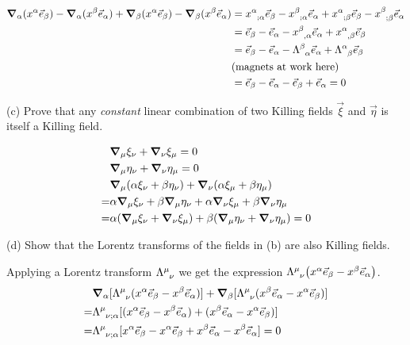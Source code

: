 \documentclass[gr-notes.tex]{subfiles}
\begin{document}
\begin{align*}
  \grad_\alpha (x^\alpha \vec{e}_\beta) -
  \grad_\alpha (x^\beta \vec{e}_\alpha) +
  \grad_\beta (x^\alpha \vec{e}_\beta) -
  \grad_\beta (x^\beta \vec{e}_\alpha)
  &=
  \tensor{x}{^\alpha_{;\alpha}} \vec{e}_\beta -
  \tensor{x}{^\beta_{;\alpha}} \vec{e}_\alpha +
  \tensor{x}{^\alpha_{;\beta}} \vec{e}_\beta -
  \tensor{x}{^\beta_{;\beta}} \vec{e}_\alpha
  \\ &=
  \vec{e}_\beta -
  \vec{e}_\alpha -
  \tensor{x}{^\beta_{,\alpha}} \vec{e}_\alpha +
  \tensor{x}{^\alpha_{,\beta}} \vec{e}_\beta
  \\ &=
  \vec{e}_\beta -
  \vec{e}_\alpha -
  \tensor{\Lambda}{^\beta_\alpha} \vec{e}_\alpha +
  \tensor{\Lambda}{^\alpha_\beta} \vec{e}_\beta
  \\ &
  \text{(magnets at work here)}
  \\ &=
  \vec{e}_\beta -
  \vec{e}_\alpha -
  \vec{e}_\beta +
  \vec{e}_\alpha =
  0
\end{align*}


(c) Prove that any \emph{constant} linear combination of two Killing fields $\vec\xi$ and $\vec\eta$ is itself a Killing field.

\begin{align*}
  &
  \grad_\mu \xi_\nu + \grad_\nu \xi_\mu = 0
  \\
  &
  \grad_\mu \eta_\nu + \grad_\nu \eta_\mu = 0
  \\ &
  \grad_\mu (\alpha \xi_\nu + \beta \eta_\nu) +
  \grad_\nu (\alpha \xi_\mu + \beta \eta_\mu)
  \\ =&
  \alpha \grad_\mu \xi_\nu + \beta \grad_\mu \eta_\nu +
  \alpha \grad_\nu \xi_\mu + \beta \grad_\nu \eta_\mu
  \\ =&
  \alpha (\grad_\mu \xi_\nu + \grad_\nu \xi_\mu) +
  \beta (\grad_\mu \eta_\nu + \grad_\nu \eta_\mu) =
  0
\end{align*}


(d)
Show that the Lorentz transforms of the fields in (b) are also Killing fields.

Applying a Lorentz transform $\tensor{\Lambda}{^\mu_\nu}$ we get the expression $\tensor{\Lambda}{^\mu_\nu} \qty(x^\alpha \vec{e}_\beta - x^\beta \vec{e}_\alpha)$.
%
\begin{align*}
  &
  \grad_\alpha
  [
    \tensor{\Lambda}{^\mu_\nu}
    (x^\alpha \vec{e}_\beta - x^\beta \vec{e}_\alpha)
  ] +
  \grad_\beta
  [
    \tensor{\Lambda}{^\mu_\nu}
    (x^\beta \vec{e}_\alpha - x^\alpha \vec{e}_\beta)
  ]
  \\ =&
  \tensor{\Lambda}{^\mu_{\nu;\alpha}}
  [
    (x^\alpha \vec{e}_\beta - x^\beta \vec{e}_\alpha) +
    (x^\beta \vec{e}_\alpha - x^\alpha \vec{e}_\beta)
  ]
  \\ =&
  \tensor{\Lambda}{^\mu_{\nu;\alpha}}
  [
    x^\alpha \vec{e}_\beta - x^\alpha \vec{e}_\beta +
    x^\beta \vec{e}_\alpha - x^\beta \vec{e}_\alpha
  ] = 0
\end{align*}
\end{document}
